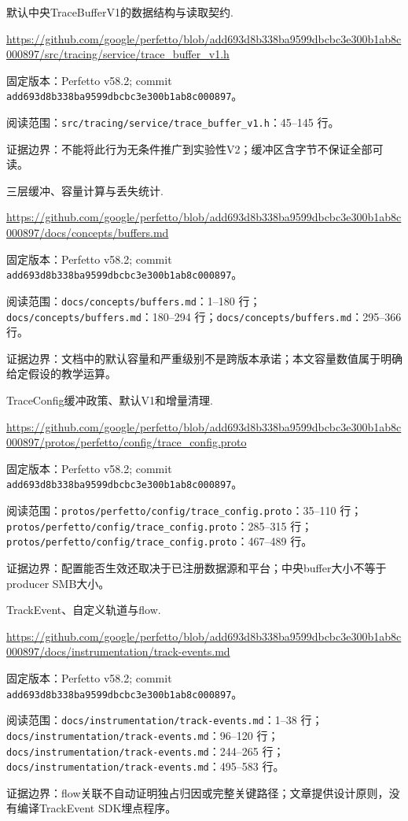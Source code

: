 \documentclass[UTF8,fontset=fandol,openany,11pt]{ctexbook}
\begin{document}
\begin{thebibliography}{999}
 默认中央TraceBufferV1的数据结构与读取契约.\par
\url{https://github.com/google/perfetto/blob/add693d8b338ba9599dbcbc3e300b1ab8c000897/src/tracing/service/trace_buffer_v1.h}\par
{\small\raggedright 固定版本：Perfetto v58.2; commit \texttt{add693d8\allowbreak{}b338ba95\allowbreak{}99dbcbc3\allowbreak{}e300b1ab\allowbreak{}8c000897}。\par
阅读范围：\nolinkurl{src/tracing/service/trace_buffer_v1.h}：45–145 行。\par
证据边界：不能将此行为无条件推广到实验性V2；缓冲区含字节不保证全部可读。
}

 三层缓冲、容量计算与丢失统计.\par
\url{https://github.com/google/perfetto/blob/add693d8b338ba9599dbcbc3e300b1ab8c000897/docs/concepts/buffers.md}\par
{\small\raggedright 固定版本：Perfetto v58.2; commit \texttt{add693d8\allowbreak{}b338ba95\allowbreak{}99dbcbc3\allowbreak{}e300b1ab\allowbreak{}8c000897}。\par
阅读范围：\nolinkurl{docs/concepts/buffers.md}：1–180 行；\nolinkurl{docs/concepts/buffers.md}：180–294 行；\nolinkurl{docs/concepts/buffers.md}：295–366 行。\par
证据边界：文档中的默认容量和严重级别不是跨版本承诺；本文容量数值属于明确给定假设的教学运算。
}

 TraceConfig缓冲政策、默认V1和增量清理.\par
\url{https://github.com/google/perfetto/blob/add693d8b338ba9599dbcbc3e300b1ab8c000897/protos/perfetto/config/trace_config.proto}\par
{\small\raggedright 固定版本：Perfetto v58.2; commit \texttt{add693d8\allowbreak{}b338ba95\allowbreak{}99dbcbc3\allowbreak{}e300b1ab\allowbreak{}8c000897}。\par
阅读范围：\nolinkurl{protos/perfetto/config/trace_config.proto}：35–110 行；\nolinkurl{protos/perfetto/config/trace_config.proto}：285–315 行；\nolinkurl{protos/perfetto/config/trace_config.proto}：467–489 行。\par
证据边界：配置能否生效还取决于已注册数据源和平台；中央buffer大小不等于producer SMB大小。
}

 TrackEvent、自定义轨道与flow.\par
\url{https://github.com/google/perfetto/blob/add693d8b338ba9599dbcbc3e300b1ab8c000897/docs/instrumentation/track-events.md}\par
{\small\raggedright 固定版本：Perfetto v58.2; commit \texttt{add693d8\allowbreak{}b338ba95\allowbreak{}99dbcbc3\allowbreak{}e300b1ab\allowbreak{}8c000897}。\par
阅读范围：\nolinkurl{docs/instrumentation/track-events.md}：1–38 行；\nolinkurl{docs/instrumentation/track-events.md}：96–120 行；\nolinkurl{docs/instrumentation/track-events.md}：244–265 行；\nolinkurl{docs/instrumentation/track-events.md}：495–583 行。\par
证据边界：flow关联不自动证明独占归因或完整关键路径；文章提供设计原则，没有编译TrackEvent SDK埋点程序。
}


\end{thebibliography}
\end{document}
